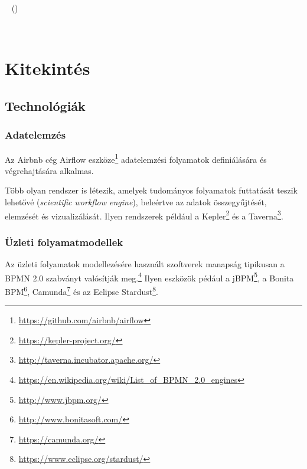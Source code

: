 ~\cite{UML}  ()

~\cite{omg2011bpmn}


\section{Kitekintés}

%
%
%
%
%
%
%
%

\subsection{Technológiák\kieg}

\subsubsection{Adatelemzés}

Az Airbnb cég Airflow eszköze\footnote{\url{https://github.com/airbnb/airflow}} adatelemzési folyamatok definiálására és végrehajtására alkalmas.

Több olyan rendszer is létezik, amelyek tudományos folyamatok futtatását teszik lehetővé (\emph{scientific workflow engine}), beleértve az adatok összegyűjtését, elemzését és vizualizálását. Ilyen rendszerek például a
Kepler\footnote{\url{https://kepler-project.org/}} és a Taverna\footnote{\url{http://taverna.incubator.apache.org/}}.

\subsubsection{Üzleti folyamatmodellek}

Az üzleti folyamatok modellezésére használt szoftverek manapság tipikusan a BPMN 2.0 szabványt valósítják meg.\footnote{\url{https://en.wikipedia.org/wiki/List_of_BPMN_2.0_engines}}
Ilyen eszközök pédául a jBPM\footnote{\url{http://www.jbpm.org/}}, a Bonita BPM\footnote{\url{http://www.bonitasoft.com/}}, Camunda\footnote{\url{https://camunda.org/}} és az Eclipse Stardust\footnote{\url{https://www.eclipse.org/stardust/}}.
